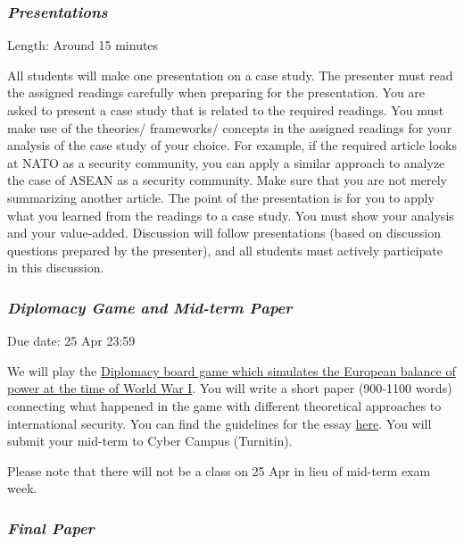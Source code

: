 \documentclass[
  letterpaper,
  DIV=11,
  numbers=noendperiod]{scrartcl}
\begin{document}
\hypertarget{presentations}{%
\subsubsection{\texorpdfstring{\textbf{\emph{Presentations}}}{Presentations}}\label{presentations}}

Length: Around 15 minutes

All students will make one presentation on a case study. The presenter
must read the assigned readings carefully when preparing for the
presentation. You are asked to present a case study that is related to
the required readings. You must make use of the theories/ frameworks/
concepts in the assigned readings for your analysis of the case study of
your choice. For example, if the required article looks at NATO as a
security community, you can apply a similar approach to analyze the case
of ASEAN as a security community. Make sure that you are not merely
summarizing another article. The point of the presentation is for you to
apply what you learned from the readings to a case study. You must show
your analysis and your value-added. Discussion will follow presentations
(based on discussion questions prepared by the presenter), and all
students must actively participate in this discussion.

\hypertarget{sec-mid-term}{%
\subsubsection{\texorpdfstring{\textbf{\emph{Diplomacy Game and Mid-term
Paper}}}{Diplomacy Game and Mid-term Paper}}\label{sec-mid-term}}

Due date: 25 Apr 23:59

We will play the \href{https://www.playdiplomacy.com/}{Diplomacy board
game which simulates the European balance of power at the time of World
War I}. You will write a short paper (900-1100 words) connecting what
happened in the game with different theoretical approaches to
international security. You can find the guidelines for the essay
\href{mid-term-instructions.qmd}{here}. You will submit your mid-term to
Cyber Campus (Turnitin).

Please note that there will not be a class on 25 Apr in lieu of mid-term
exam week.

\hypertarget{sec-final}{%
\subsubsection{\texorpdfstring{\textbf{\emph{Final
Paper}}}{Final Paper}}\label{sec-final}}
\end{document}
